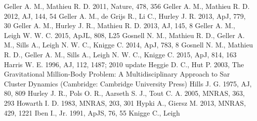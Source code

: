 \documentclass[useAMS,usenatbib]{mnras}
\begin{document}
\begin{thebibliography}{99}
  Geller A. M., Mathieu R. D. 2011, Nature, 478, 356
 Geller A. M., Mathieu R. D. 2012, AJ, 144, 54
 Geller A. M.,
de Grijs R., Li C., Hurley J. R. 2013, ApJ, 779, 30
 Geller A. M., Hurley J. R., Mathieu R. D. 2013, AJ, 145, 8
 Geller A. M., Leigh W. W. C. 2015, ApJL, 808, L25 
 Gosnell N. M., Mathieu R. D., Geller A. M., Sills A., Leigh N. W. C., Knigge C. 2014, ApJ, 783, 8
 Gosnell N. M., Mathieu R. D., Geller A. M., Sills A., Leigh N. W. C., Knigge C. 2015, ApJ, 814, 163
 Harris W. E. 1996, AJ, 112,
  1487; 2010 update
  Heggie D. C., Hut P. 2003, The Gravitational Million-Body Problem:
  A Multidisciplinary Approach to Sar Cluster Dynamics (Cambridge:
  Cambridge University Press)
 Hills J. G. 1975, AJ, 80, 809
  Hurley J. R., Pols O. R., Aarseth S. J., Tout C. A. 2005, MNRAS,
  363, 293
 Howarth I. D. 1983, MNRAS, 203, 301
 Hypki A., Giersz M. 2013,
MNRAS, 429, 1221
  Iben I., Jr. 1991, ApJS, 76, 55
 Knigge C., Leigh

\end{thebibliography}
\end{document}
